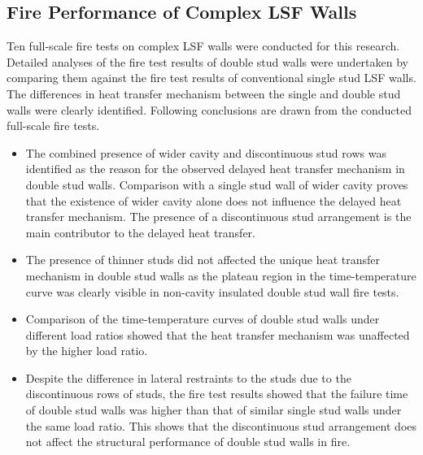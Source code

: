 \subsection{Fire Performance of Complex LSF Walls}

Ten full-scale fire tests on complex LSF walls were conducted for this research. Detailed analyses of the fire test results of double stud walls were undertaken by comparing them against the fire test results of conventional single stud LSF walls. The differences in heat transfer mechanism between the single and double stud walls were clearly identified. Following conclusions are drawn from the conducted full-scale fire tests.
\begin{itemize}
	\item The combined presence of wider cavity and discontinuous stud rows was identified as the reason for the observed delayed heat transfer mechanism in double stud walls. Comparison with a single stud wall of wider cavity proves that the existence of wider cavity alone does not influence the delayed heat transfer mechanism. The presence of a discontinuous stud arrangement is the main contributor to the delayed heat transfer.
	\item The presence of thinner studs did not affected the unique heat transfer mechanism in double stud walls as the plateau region in the time-temperature curve was clearly visible in non-cavity insulated double stud wall fire tests.
	\item Comparison of the time-temperature curves of double stud walls under different load ratios showed that the heat transfer mechanism was unaffected by the higher load ratio.
	\item Despite the difference in lateral restraints to the studs due to the discontinuous rows of studs, the fire test results showed that the failure time of double stud walls was higher than that of similar single stud walls under the same load ratio. This shows that the discontinuous stud arrangement does not affect the structural performance of double stud walls in fire.
\end{itemize}

